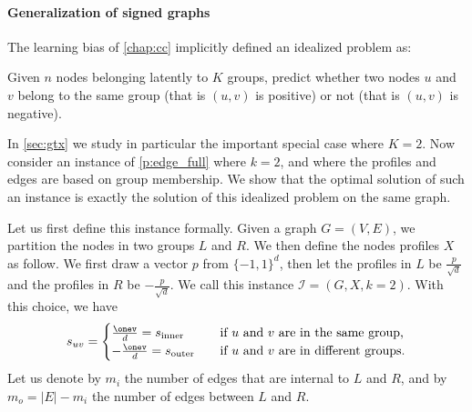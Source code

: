 \paragraph{Generalization of signed graphs}
\label{par:generalization_of_signed_graphs}

The learning bias of \autoref{chap:cc} implicitly defined an idealized \esp{} problem as:
\begin{problem}
  \label{p:edge_esp}
  Given $n$ nodes belonging latently to $K$ groups, predict whether two nodes $u$ and $v$ belong to
  the same group (that is $(u,v)$ is positive) or not (that is $(u,v)$ is negative).
\end{problem}
In \autoref{sec:gtx} we study in particular the important special case where $K=2$. Now consider an
instance of \autoref{p:edge_full} where $k=2$, and where the profiles and edges are based on group
membership. We show that the optimal solution of such an instance is exactly the solution of this
idealized \esp{} problem on the same graph.

Let us first define this instance formally. Given a graph $G=(V,E)$, we partition the nodes in two
groups $L$ and $R$. We then define the nodes profiles $X$ as follow. We first draw \uar{} a vector $p$
from $\{-1, 1\}^d$, then let the profiles in $L$ be $\frac{p}{\sqrt{d}}$ and the
profiles in $R$ be $-\frac{p}{\sqrt{d}}$. We call this instance $\mathcal{I} = (G, X, k=2)$. With
this choice, we have
\begin{equation*}
  s_{uv} =
  \begin{cases}
    \frac{\onev}{d} = s_{\mathrm{inner}} & \quad \text{if $u$ and $v$ are in the same group,} \\
    -\frac{\onev}{d} = s_{\mathrm{outer}} & \quad \text{if $u$ and $v$ are in different groups.}
  \end{cases}
\end{equation*}
Let us denote by $m_i$ the number of edges that are internal to $L$ and $R$, and by $m_o = |E| -
m_i$ the number of edges between $L$ and $R$.

